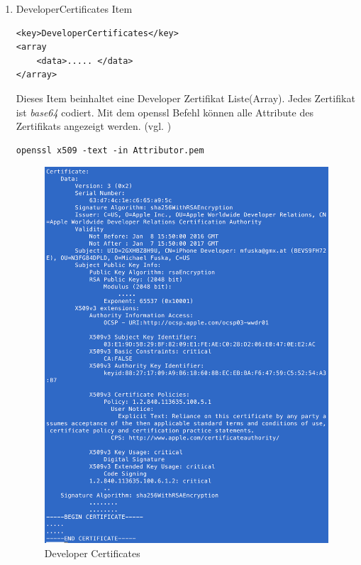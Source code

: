 \begin{enumerate}
    \item DeveloperCertificates Item
\begin{lstlisting}[captionpos=b, caption={DeveloperCertificates Item}]        
<key>DeveloperCertificates</key>
<array                
    <data>..... </data>
</array>
\end{lstlisting}
Dieses Item beinhaltet eine Developer Zertifikat Liste(Array). Jedes Zertifikat ist \textit{\glqq base64\grqq{}} codiert. Mit dem \glqq openssl\grqq{} Befehl können alle Attribute des Zertifikats angezeigt werden. (vgl. \cite{iOSSec[5], Hacking[1]}) \newline

\lstset{
    language=bash,
    }
\begin{lstlisting}[captionpos=b, caption={Befehl: openssl -- (Siehe Abbildung: \ref{fig:DeveloperCertificates})}]
openssl x509 -text -in Attributor.pem 
\end{lstlisting}

\begin{figure}[!ht]
        \centering
                \includegraphics[scale=0.7]{Cert-output}
        \caption{Developer Certificates}
        \label{fig:DeveloperCertificates}
\end{figure}


\end{enumerate}
